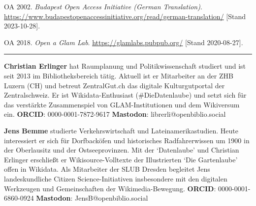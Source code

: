 \documentclass[a4paper,
fontsize=11pt,
oneside,
numbers=noperiodatend,
parskip=half-,
bibliography=totoc,
final
]{scrartcl}
\begin{document}
OA 2002. \emph{Budapest Open Access Initiative (German Translation)}.
\url{https://www.budapestopenaccessinitiative.org/read/german-translation/}
{[}Stand 2023-10-28{]}.

OA 2018. \emph{Open a Glam Lab}. \url{https://glamlabs.pubpub.org/} {[}Stand
2020-08-27{]}.

\begin{center}\rule{0.5\linewidth}{0.5pt}\end{center}

\textbf{Christian Erlinger} hat Raumplanung und Politikwissenschaft
studiert und ist seit 2013 im Bibliotheksbereich tätig. Aktuell ist er
Mitarbeiter an der ZHB Luzern (CH) und betreut ZentralGut.ch das
digitale Kulturgutportal der Zentralschweiz. Er ist Wikidata-Enthusiast
(\#DieDatenlaube) und setzt sich für das verstärkte Zusammenspiel von
GLAM-Institutionen und dem Wikiversum ein. \textbf{ORCID}:
0000-0001-7872-9617 \textbar{} \textbf{Mastodon}:
librerli@openbiblio.social

\textbf{Jens Bemme} studierte Verkehrswirtschaft und
Lateinamerikastudien. Heute interessiert er sich für Dorfbacköfen und
historisches Radfahrerwissen um 1900 in der Oberlausitz und der
Ostseeprovinzen. Mit der `Datenlaube' und Christian Erlinger erschließt
er Wikisource-Volltexte der Illustrierten `Die Gartenlaube' offen in
Wikidata. Als Mitarbeiter der SLUB Dresden begleitet Jens
landeskundliche Citizen Science-Initiativen insbesondere mit den
digitalen Werkzeugen und Gemeinschaften der Wikimedia-Bewegung.
\textbf{ORCID}: 0000-0001-6860-0924 \textbar{} \textbf{Mastodon}:
JensB@openbiblio.social
\end{document}
